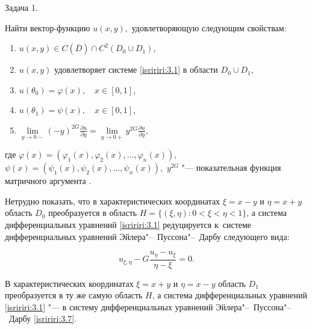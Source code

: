 {\small \sc Задача 1.} {\it

Найти вектор-функцию $u(x,y),$ удовлетворяющую следующим свойствам\/{\rm:}

\begin{enumerate}

\item[\rm 1)] $u(x,y)\in {C}(\overline{D})\cap {C}^2(D_0\cup D_1)$, %

\item[\rm 2)] $u(x,y)$ удовлетворяет системе \eqref{isririri:3.1} в области $D_0\cup D_1$,%

\item[\rm 3)] $u(\theta_0)=\varphi(x), \quad x\in [0, 1]$,%

\item[\rm 4)] $u(\theta_1)=\psi(x), \quad x\in [0, 1]$,%

\item[\rm 5)] $\lim\limits_{y \to 0-} (-y)^{2G}\frac{\partial u}{\partial y}=\lim \limits_{y \to 0+} y^{2G} \frac{\partial u}{\partial y}$,%

\end{enumerate}

где $\varphi(x)=(\varphi_1(x), \varphi_2(x), \ldots, \varphi_n(x)),$ $\psi(x)=(\psi_1(x), \psi_2(x), \ldots, \psi_n(x)),$ $y^{2G}$ "--- показательная функция матричного аргумента \rm \cite{rayanova:bib:Gant}.

}



\smallskip



Нетрудно показать, что в характеристических координатах $\xi=x-y$ и $\eta=x+y$ область $D_0$ преобразуется в область $H=\{(\xi,\eta):0<\xi<\eta<1\}$, а система дифференциальных уравнений \eqref{isririri:3.1} редуцируется к~системе дифференциальных уравнений Эйлера"--~Пуссона"--~Дарбу следующего вида:

\begin{equation}\label{isririri:3.7}

u_{\xi,\eta}-G\frac{u_\eta-u_\xi}{\eta-\xi}=0.

\end{equation}



В характеристических координатах $\xi=x+y$ и $\eta=x-y$ область $D_1$ преобразуется в ту же  самую область $H$, а система дифференциальных уравнений \eqref{isririri:3.1} "--- в систему дифференциальных уравнений Эйлера"--~Пуссона"--~Дарбу \eqref{isririri:3.7}.



